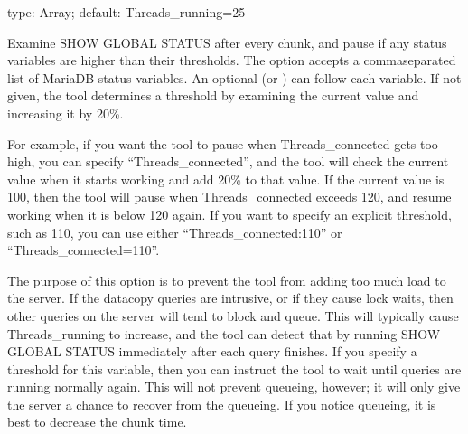 \documentclass[letterpaper,10pt,english]{sphinxmanual}
\begin{document}

\begin{fulllineitems}
\label{\detokenize{mariadb-schema-change:cmdoption-mariadb-schema-change-max-load}}
\sphinxAtStartPar
type: Array; default: Threads\_running=25

\sphinxAtStartPar
Examine SHOW GLOBAL STATUS after every chunk, and pause if any status variables
are higher than their thresholds.  The option accepts a comma\sphinxhyphen{}separated list of
MariaDB status variables.  An optional  (or ) can follow
each variable.  If not given, the tool determines a threshold by examining the
current value and increasing it by 20\%.

\sphinxAtStartPar
For example, if you want the tool to pause when Threads\_connected gets too high,
you can specify “Threads\_connected”, and the tool will check the current value
when it starts working and add 20\% to that value.  If the current value is 100,
then the tool will pause when Threads\_connected exceeds 120, and resume working
when it is below 120 again.  If you want to specify an explicit threshold, such
as 110, you can use either “Threads\_connected:110” or “Threads\_connected=110”.

\sphinxAtStartPar
The purpose of this option is to prevent the tool from adding too much load to
the server. If the data\sphinxhyphen{}copy queries are intrusive, or if they cause lock waits,
then other queries on the server will tend to block and queue. This will
typically cause Threads\_running to increase, and the tool can detect that by
running SHOW GLOBAL STATUS immediately after each query finishes.  If you
specify a threshold for this variable, then you can instruct the tool to wait
until queries are running normally again.  This will not prevent queueing,
however; it will only give the server a chance to recover from the queueing.  If
you notice queueing, it is best to decrease the chunk time.

\end{fulllineitems}
\end{document}
